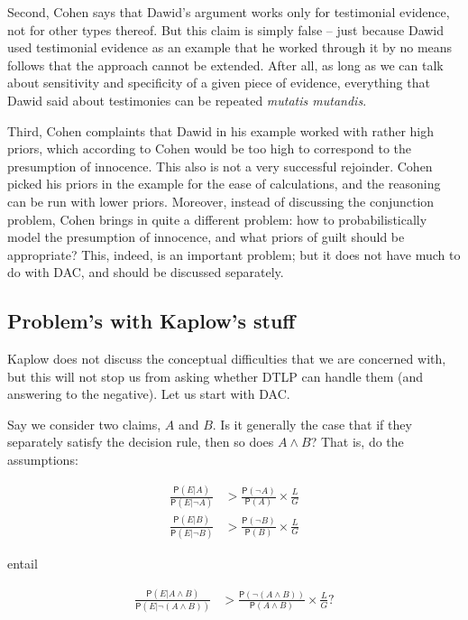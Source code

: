 \documentclass[10pt,dvipsnames,enabledeprecatedfontcommands]{scrartcl}
\newcommand{\n}{\neg}
\newcommand{\et}{\wedge}
\newcommand{\pr}[1]{\mathsf{P}(#1)}
\begin{document}
Second, Cohen says that Dawid's argument works only for testimonial
evidence, not for other types thereof. But this claim is simply false --
just because Dawid used testimonial evidence as an example that he
worked through it by no means follows that the approach cannot be
extended. After all, as long as we can talk about sensitivity and
specificity of a given piece of evidence, everything that Dawid said
about testimonies can be repeated \emph{mutatis mutandis}.

Third, Cohen complaints that Dawid in his example worked with rather
high priors, which according to Cohen would be too high to correspond to
the presumption of innocence. This also is not a very successful
rejoinder. Cohen picked his priors in the example for the ease of
calculations, and the reasoning can be run with lower priors. Moreover,
instead of discussing the conjunction problem, Cohen brings in quite a
different problem: how to probabilistically model the presumption of
innocence, and what priors of guilt should be appropriate? This, indeed,
is an important problem; but it does not have much to do with DAC, and
should be discussed separately.

\subsection{Problem's with Kaplow's
stuff}\label{problems-with-kaplows-stuff}

Kaplow does not discuss the conceptual difficulties that we are
concerned with, but this will not stop us from asking whether DTLP can
handle them (and answering to the negative). Let us start with DAC.

Say we consider two claims, \(A\) and \(B\). Is it generally the case
that if they separately satisfy the decision rule, then so does
\(A\et B\)? That is, do the assumptions:

\begin{align*}
 \frac{\pr{E\vert A}}{\pr{E\vert \n A}}  & > \frac{\pr{\n A}}{\pr{A}} \times \frac{L}{G}\\
 \frac{\pr{E\vert B}}{\pr{E\vert \n B}}  & > \frac{\pr{\n B}}{\pr{B}} \times \frac{L}{G}
 \end{align*}

\noindent entail

\begin{align*}
 \frac{\pr{E\vert A\et B}}{\pr{E\vert \n (A\et B)}}  & > \frac{\pr{\n (A\et B)}}{
 \pr{A\et B}} \times \frac{L}{G}?
 \end{align*}
\end{document}
